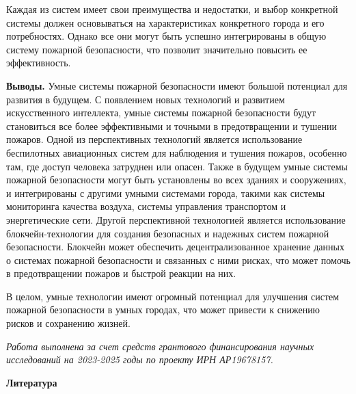 \begin{multicols}{2}

Каждая из систем имеет свои преимущества и недостатки, и выбор
конкретной системы должен основываться на характеристиках конкретного
города и его потребностях. Однако все они могут быть успешно
интегрированы в общую систему пожарной безопасности, что позволит
значительно повысить ее эффективность.

{\bfseries Выводы.} Умные системы пожарной безопасности имеют большой
потенциал для развития в будущем. С появлением новых технологий и
развитием искусственного интеллекта, умные системы пожарной безопасности
будут становиться все более эффективными и точными в предотвращении и
тушении пожаров. Одной из перспективных технологий является
использование беспилотных авиационных систем для наблюдения и тушения
пожаров, особенно там, где доступ человека затруднен или опасен. Также в
будущем умные системы пожарной безопасности могут быть установлены во
всех зданиях и сооружениях, и интегрированы с другими умными системами
города, такими как системы мониторинга качества воздуха, системы
управления транспортом и энергетические сети. Другой перспективной
технологией является использование блокчейн-технологии для создания
безопасных и надежных систем пожарной безопасности. Блокчейн может
обеспечить децентрализованное хранение данных о системах пожарной
безопасности и связанных с ними рисках, что может помочь в
предотвращении пожаров и быстрой реакции на них.

В целом, умные технологии имеют огромный потенциал для улучшения систем
пожарной безопасности в умных городах, что может привести к снижению
рисков и сохранению жизней.
\end{multicols}

\emph{Работа выполнена за счет средств грантового финансирования научных
исследований на 2023-2025 годы по проекту ИРН АР19678157.}

{\bfseries Литература}



